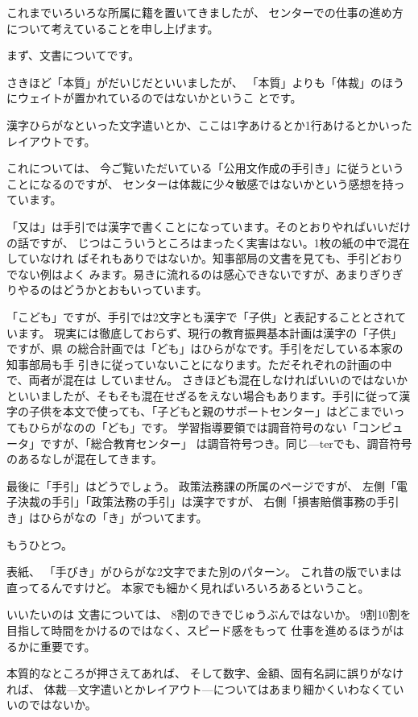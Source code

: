 \documentclass[uplatex,jis2004,dvipdfmx,12pt]{jsarticle}
\begin{document}
これまでいろいろな所属に籍を置いてきましたが、
センターでの仕事の進め方について考えていることを申し上げます。

まず、文書についてです。

さきほど「本質」がだいじだといいましたが、
「本質」よりも「体裁」のほうにウェイトが置かれているのではないかというこ
とです。


漢字ひらがなといった文字遣いとか、ここは1字あけるとか1行あけるとかいったレイアウトです。

これについては、
今ご覧いただいている「公用文作成の手引き」に従うということになるのですが、
センターは体裁に少々敏感ではないかという感想を持っています。

「又は」は手引では漢字で書くことになっています。そのとおりやればいいだけの話ですが、
じつはこういうところはまったく実害はない。1枚の紙の中で混在していなけれ
ばそれもありではないか。知事部局の文書を見ても、手引どおりでない例はよく
みます。易きに流れるのは感心できないですが、あまりぎりぎりやるのはどうかとおもいっています。


「こども」ですが、手引では2文字とも漢字で「子供」と表記することとされています。
現実には徹底しておらず、現行の教育振興基本計画は漢字の「子供」ですが、県
の総合計画では「ども」はひらがなです。手引をだしている本家の知事部局も手
引きに従っていないことになります。ただそれぞれの計画の中で、両者が混在は
していません。
さきほども混在しなければいいのではないかといいましたが、そもそも混在せざるをえない場合もあります。手引に従って漢字の子供を本文で使っても、「子どもと親のサポートセンター」はどこまでいってもひらがなのの「ども」です。
学習指導要領では調音符号のない「コンピュータ」ですが、「総合教育センター」
は調音符号つき。同じ---terでも、調音符号のあるなしが混在してきます。

最後に「手引」はどうでしょう。
政策法務課の所属のページですが、
左側「電子決裁の手引」「政策法務の手引」は漢字ですが、
右側「損害賠償事務の手引き」はひらがなの「き」がついてます。


もうひとつ。

表紙、
「手びき」がひらがな2文字でまた別のパターン。
これ昔の版でいまは直ってるんですけど。
本家でも細かく見ればいろいろあるということ。

いいたいのは
文書については、
8割のできでじゅうぶんではないか。
9割10割を目指して時間をかけるのではなく、スピード感をもって
仕事を進めるほうがはるかに重要です。

本質的なところが押さえてあれば、
そして数字、金額、固有名詞に誤りがなければ、
体裁---文字遣いとかレイアウト---についてはあまり細かくいわなくていいのではないか。
\end{document}
